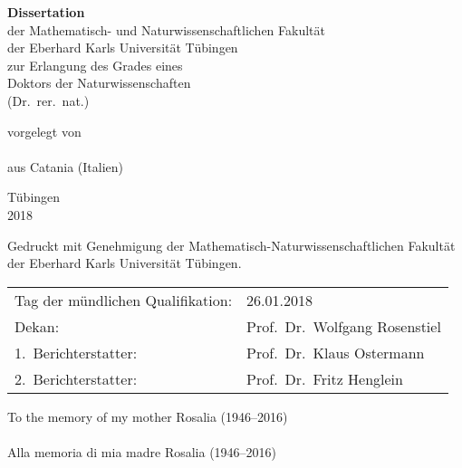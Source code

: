 {
\setlength{\parskip}{0pt}
\setlength{\parindent}{0pt}
\large
\sffamily
\linespread{1.5}
\selectfont
\begin{titlepage}
\makeatletter %
\centering
%
\selectfont

\vspace*{-2cm}

{\huge \bfseries
  \@title%
  \par%
}

\vspace{4cm}

{\bfseries Dissertation}\\
der Mathematisch- und Naturwissenschaftlichen Fakult\"at\\
der Eberhard Karls Universit\"at T\"ubingen\\
zur Erlangung des Grades eines\\
Doktors der Naturwissenschaften\\
(Dr.\ rer.\ nat.)

\vspace{4 cm}

vorgelegt von \\
\@author \\
aus Catania (Italien)

\vspace{2 cm}

T\"ubingen\\
2018

\vfill
\end{titlepage}
\clearpage
\thispagestyle{empty}
%
\vspace*{\fill}

Gedruckt mit Genehmigung der Mathematisch-Naturwissenschaftlichen Fakultät der
Eberhard Karls Universität Tübingen.

\vspace{\dimexpr \bigskipamount * 3 \relax}
%
\begin{tabular}{@{}ll@{}}
Tag der mündlichen Qualifikation: & 26.01.2018\\
Dekan:               & Prof.\ Dr.\ Wolfgang Rosenstiel\\
1.\ Berichterstatter: & Prof.\ Dr.\ Klaus Ostermann\\
2.\ Berichterstatter: & Prof.\ Dr.\ Fritz Henglein
\end{tabular}
%
\vspace{-1cm} %
%
} %
%
\cleardoublepage
{%
\begin{flushright}
  \null{}
  To the memory of my mother Rosalia (1946--2016)\\
  ~\\
  Alla memoria di mia madre Rosalia (1946--2016)

  \null
\end{flushright}}
